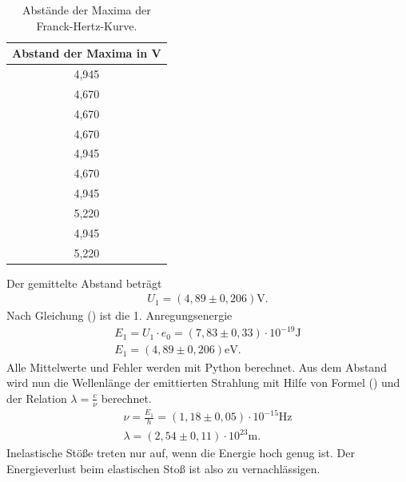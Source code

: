 \begin{table}[H]
  \centering
  \caption{Abstände der Maxima der Franck-Hertz-Kurve.}
  \label{tab:Parameter}
  \begin{tabular}{c }
    \toprule
     Abstand der Maxima in V \\
    \bottomrule
     4,945\\
     4,670\\
     4,670\\
     4,670\\
     4,945\\
    4,670\\
    4,945\\
    5,220\\
     4,945\\
    5,220\\
   \bottomrule
  \end{tabular}
\end{table}

Der gemittelte Abstand beträgt
\begin{align*}
U_1 = (4,89 \pm 0,206) \si{\V}.
\end{align*}
Nach Gleichung () ist die 1. Anregungsenergie
\begin{align*}
E_1 = U_1 \cdot e_0 = (7,83 \pm 0,33)\cdot 10^{-19} \si{\J} \\
E_1 = (4,89 \pm 0,206) \si{\eV}.
\end{align*}
Alle Mittelwerte und Fehler werden mit Python berechnet.
Aus dem Abstand wird nun die Wellenlänge der emittierten Strahlung mit Hilfe von Formel () und der Relation $\lambda = \frac{c}{\nu} $ berechnet.
\begin{align*}
\nu = \frac{E_1}{h} = (1,18 \pm 0,05)\cdot 10^{-15} \si{\Hz}\\
\lambda = (2,54 \pm 0,11)\cdot 10^{23} \si{\m}.
\end{align*}
Inelastische Stöße treten nur auf, wenn die Energie hoch genug ist.
Der Energieverlust beim elastischen Stoß ist also zu vernachlässigen.

